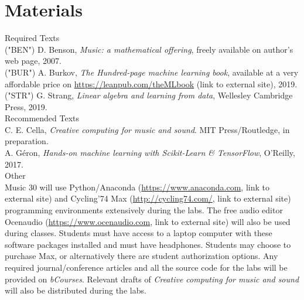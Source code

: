 \documentclass[letterpaper]{inzane_syllabus} %
\begin{document}
\vspace{0.5cm} %
\section{Materials}

{\color{myCOLOR} Required Texts}\\
("BEN") D. Benson, \textit{Music: a mathematical offering}, freely available on author's web page, 2007.\\
("BUR") A. Burkov, \textit{The Hundred-page machine learning book}, available at a very affordable price on \url{https://leanpub.com/theMLbook} (link to external site), 2019.\\
("STR") G. Strang, \textit{Linear algebra and learning from data}, Wellesley Cambridge Press, 2019.\\

{\color{myCOLOR} Recommended Texts}\\
C. E. Cella, \textit{Creative computing for music and sound}. MIT Press/Routledge, in preparation. \\
A. G\'eron, \textit{Hands-on machine learning with Scikit-Learn \& TensorFlow}, O'Reilly, 2017.\\

{\color{myCOLOR} Other}\\
Music 30 will use Python/Anaconda (\url{https://www.anaconda.com}, link to external site) and Cycling’74 Max (\url{http://cycling74.com/}, link to external site) programming environments extensively during the labs. The free audio editor Ocenaudio (\url{https://www.ocenaudio.com}, link to external site) will also be used during classes. Students must have access to a laptop computer with these software packages installed and must have headphones. Students may choose to purchase Max, or alternatively there are student authorization options. Any required journal/conference articles and all the source code for the labs will be provided on \emph{bCourses}. Relevant drafts of \emph{Creative computing for music and sound} will also be distributed during the labs. 

\vspace{0.5cm}
\end{document}
